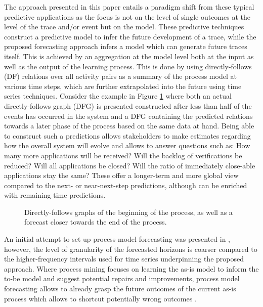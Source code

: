 The approach presented in this paper entails a paradigm shift from these typical predictive applications as the focus is not on the level of single outcomes at the level of the trace and/or event but on the model.
These predictive techniques construct a predictive model to infer the future development of a trace, while the proposed forecasting approach infers a model which can generate future traces itself.
This is achieved by an aggregation at the model level both at the input as well as the output of the learning process.
This is done by using directly-follows (DF) relations over all activity pairs as a summary of the process model at various time steps, which are further extrapolated into the future using time series techniques.
Consider the example in Figure \ref{fig:dfg_example_intro} where both an actual directly-follows graph (DFG) is presented constructed after less than half of the events has occurred in the system and a DFG containing the predicted relations towards a later phase of the process based on the same data at hand.
Being able to construct such a predictions allows stakeholders to make estimates regarding how the overall system will evolve and allows to answer questions such as: How many more applications will be received? Will the backlog of verifications be reduced? Will all applications be closed? Will the ratio of immediately close-able applications stay the same?
These offer a longer-term and more global view compared to the next- or near-next-step predictions, although can be enriched with remaining time predictions.
\begin{figure}
    \centering
    \caption{Directly-follows graphs of the beginning of the process, as well as a forecast closer towards the end of the process.}
    \label{fig:dfg_example_intro}
\end{figure}

An initial attempt to set up process model forecasting was presented in \cite{de2020predictive}, however, the level of granularity of the forecasted horizons is coarser compared to the higher-frequency intervals used for time series underpinning the proposed approach.
Where process mining focuses on learning the as-is model to inform the to-be model and suggest potential repairs and improvements, process model forecasting allows to already grasp the future outcomes of the current as-is process which allows to shortcut potentially wrong outcomes \cite{DBLP:conf/bpm/PollPRRR18}.

